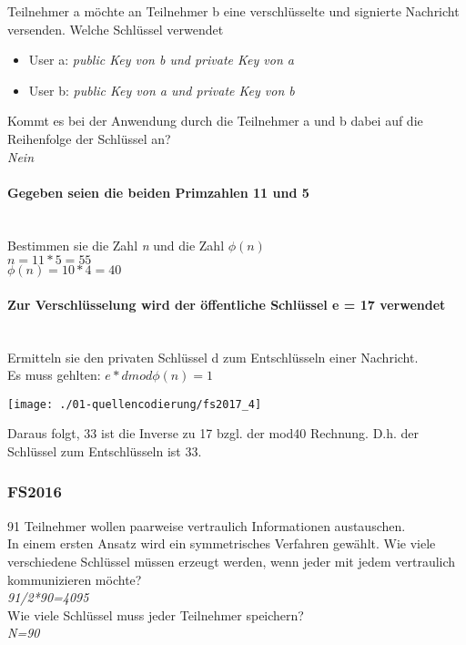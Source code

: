 Teilnehmer a möchte an Teilnehmer b eine verschlüsselte und signierte Nachricht versenden. Welche Schlüssel verwendet
\begin{itemize}
    \item User a: \textit{public Key von b und private Key von a}
    \item User b: \textit{public Key von a und private Key von b}\\
\end{itemize}

Kommt es bei der Anwendung durch die Teilnehmer a und b dabei auf die Reihenfolge der Schlüssel an?\\
\textit{Nein}\\

\paragraph{Gegeben seien die beiden Primzahlen 11 und 5}\mbox{}\\
Bestimmen sie die Zahl \textit{n} und die Zahl $\phi(n)$\\
$n=11*5=55$\\
$\phi(n) = 10*4=40$

\paragraph{Zur Verschlüsselung wird der öffentliche Schlüssel e  = 17 verwendet}\mbox{}\\
Ermitteln sie den privaten Schlüssel d zum Entschlüsseln einer Nachricht.\\
Es muss gehlten: $e*dmod\phi(n)=1$\\

\begin{center}
    \vspace{-8pt}
    \texttt{[image: ./01-quellencodierung/fs2017\_4]}
    \vspace{-8pt}
\end{center}

Daraus folgt, 33 ist die Inverse zu 17 bzgl. der mod40 Rechnung. D.h. der Schlüssel zum Entschlüsseln ist 33.

\subsubsection{FS2016}
91 Teilnehmer wollen paarweise vertraulich Informationen austauschen.\\

In einem ersten Ansatz wird ein symmetrisches Verfahren gewählt. 
Wie viele verschiedene Schlüssel müssen erzeugt werden, wenn jeder mit jedem vertraulich kommunizieren möchte?\\
\textit{91/2*90=4095}\\

Wie viele Schlüssel muss jeder Teilnehmer speichern?\\
\textit{N=90}\\



